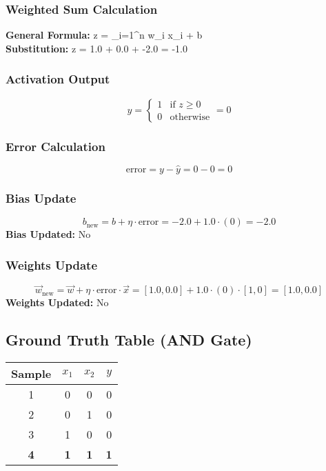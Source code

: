\documentclass{article}
\begin{document}
\subsubsection*{Weighted Sum Calculation}
\textbf{General Formula:} \quad
z = \sum_{i=1}^{n} w_i x_i + b
\\
\textbf{Substitution:} \quad
z = 1.0  + 0.0  + -2.0 = -1.0

\subsubsection*{Activation Output}
\[
\hat{y} =
\begin{cases}
1 & \text{if } z \geq 0 \\
0 & \text{otherwise}
\end{cases}
= 0
\]

\subsubsection*{Error Calculation}
\[
\text{error} = y - \hat{y} = 0 - 0 = 0
\]

\subsubsection*{Bias Update}
\[
b_{\text{new}} = b + \eta \cdot \text{error} = -2.0 + 1.0 \cdot (0) = -2.0
\]
\textbf{Bias Updated:} No

\subsubsection*{Weights Update}
\[
\vec{w}_{\text{new}} = \vec{w} + \eta \cdot \text{error} \cdot \vec{x} = 
[1.0, 0.0] + 1.0 \cdot (0) \cdot [1, 0] = 
[1.0, 0.0]
\]
\textbf{Weights Updated:} No

\subsection*{Ground Truth Table (AND Gate)}
\begin{center}
\begin{tabular}{|c|c|c|c|}
\hline
\textbf{Sample} & $x_1$ & $x_2$ & $y$ \\
\hline
1 & 0 & 0 & 0 \\
\hline
2 & 0 & 1 & 0 \\
\hline
3 & 1 & 0 & 0 \\
\hline
\rowcolor{yellow} \textbf{4} & \textbf{1} & \textbf{1} & \textbf{1} \\
\hline
\end{tabular}
\end{center}
\end{document}
